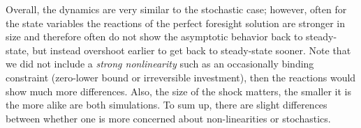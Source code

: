 \begin{enumerate}
Overall, the dynamics are very similar to the stochastic case;
  however, often for the state variables the reactions of the perfect foresight solution are stronger in size
  and therefore often do not show the asymptotic behavior back to steady-state,
  but instead overshoot earlier to get back to steady-state sooner.
Note that we did not include a \emph{strong nonlinearity} such as an occasionally binding constraint (zero-lower bound or irreversible investment),
  then the reactions would show much more differences.
Also, the size of the shock matters, the smaller it is the more alike are both simulations.
To sum up, there are slight differences between whether one is more concerned about non-linearities or stochastics.
\end{enumerate}